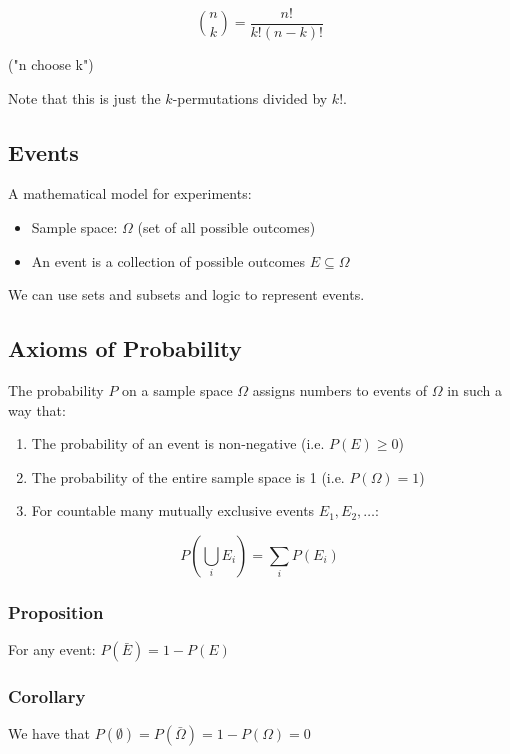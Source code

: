 $$ \binom{n}{k} = \frac{n!}{k!(n-k)!} $$

("n choose k")

Note that this is just the $k$-permutations divided by $k!$.

\subsection*{Events}

A mathematical model for experiments:

\begin{itemize}
    \item Sample space: $\Omega$ (set of all possible outcomes)
    \item An event is a collection of possible outcomes $E \subseteq \Omega$
\end{itemize}

We can use sets and subsets and logic to represent events.

\subsection*{Axioms of Probability}

The probability $P$ on a sample space $\Omega$ assigns numbers to events of $\Omega$ in such a way that:

\begin{enumerate}
    \item The probability of an event is non-negative (i.e. $P(E) \geq 0$)
    \item The probability of the entire sample space is 1 (i.e. $P(\Omega) = 1$)
    \item For countable many mutually exclusive events $E_1, E_2, \dots$:
\end{enumerate}

$$ P\left(\bigcup_{i} E_i\right) = \sum_{i} P(E_i) $$

\subsubsection*{Proposition}

For any event: $P(\bar{E}) = 1 - P(E)$

\subsubsection*{Corollary}

We have that $P(\emptyset) = P(\bar{\Omega}) = 1 - P(\Omega) = 0$

